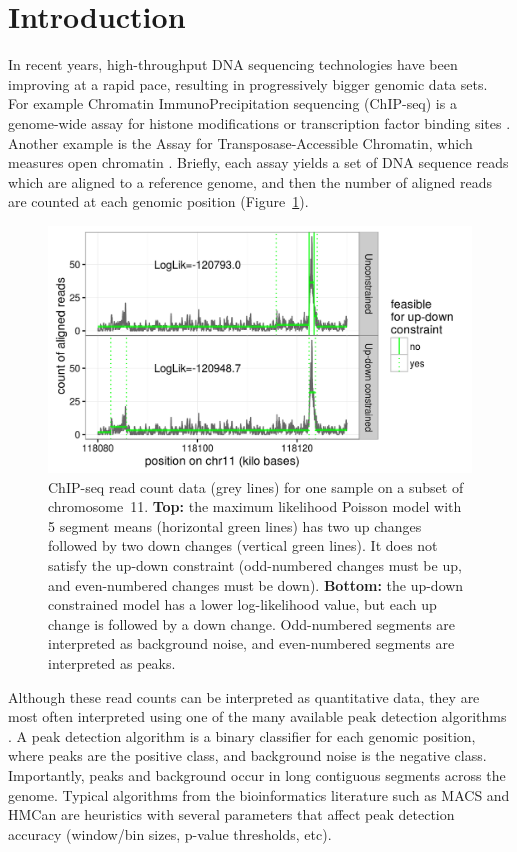 \documentclass[aoas]{imsart}
\begin{document}
\section{Introduction}

In recent years, high-throughput DNA sequencing technologies have been
improving at a rapid pace, resulting in progressively bigger genomic data
sets. For example Chromatin ImmunoPrecipitation sequencing (ChIP-seq)
is a genome-wide assay for histone modifications or transcription
factor binding sites \citep{chip-seq}. Another example is the Assay
for Transposase-Accessible Chromatin, which measures open chromatin
\citep{ATACseq}. Briefly, each assay yields a set of DNA sequence reads
which are aligned to a reference genome, and then the number of
aligned reads are counted at each genomic position
(Figure~\ref{fig:data-models}). 

\begin{figure}[h]
  \centering
  \includegraphics[width=\textwidth]{figure-data-models}
  \vskip -0.5cm
  \caption{ChIP-seq read count data (grey lines) for one sample on a
    subset of chromosome~11. \textbf{Top:} the maximum
    likelihood Poisson model with 5 segment means (horizontal green lines) has
    two up changes followed by two down changes (vertical green
    lines). It does not satisfy the up-down constraint (odd-numbered
    changes must be up, and even-numbered changes must be
    down). \textbf{Bottom:} the up-down constrained model has a lower
    log-likelihood value, but each up change is followed by a down
    change. Odd-numbered segments are interpreted as background noise,
    and even-numbered segments are interpreted as peaks.}
  \label{fig:data-models}
\end{figure}

Although these read counts can be interpreted as quantitative data,
they are most often interpreted using one of the many available peak
detection algorithms \citep{evaluation2010, rye2010manually,
  chip-seq-bench}. A peak detection algorithm is a binary classifier
for each genomic position, where peaks are the positive class, and
background noise is the negative class. Importantly, peaks and
background occur in long contiguous segments across the
genome. Typical algorithms from the bioinformatics literature such as
MACS \citep{MACS} and HMCan \citep{HMCan} are heuristics with several
parameters that affect peak detection accuracy (window/bin sizes,
p-value thresholds, etc).
\end{document}
